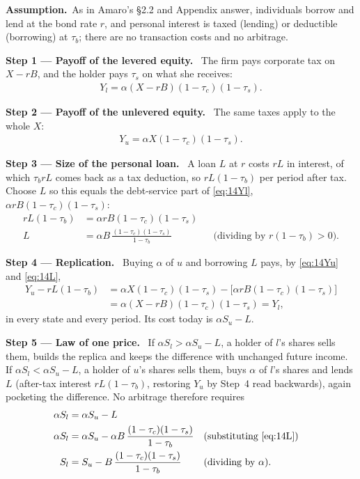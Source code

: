 \documentclass[11pt,a4paper]{article}
\numberwithin{equation}{section}
\newcommand{\step}[2]{\par\smallskip\noindent\textbf{Step #1 --- #2.}~}
\newcommand{\assumption}{\par\smallskip\noindent\textbf{Assumption.}~}
\begin{document}
\assumption As in Amaro's §2.2 and Appendix answer, individuals borrow and lend at the bond rate
$r$, and personal interest is taxed (lending) or deductible (borrowing) at $\tau_b$; there are no
transaction costs and no arbitrage.

\step{1}{Payoff of the levered equity} The firm pays corporate tax on $X-rB$, and the holder pays $\tau_s$ on what she receives:
\begin{align}
  Y_l = \alpha(X-rB)(1-\tau_c)(1-\tau_s). \label{eq:14Yl}
\end{align}

\step{2}{Payoff of the unlevered equity} The same taxes apply to the whole $X$:
\begin{align}
  Y_u = \alpha X(1-\tau_c)(1-\tau_s). \label{eq:14Yu}
\end{align}

\step{3}{Size of the personal loan} A loan $L$ at $r$ costs $rL$ in interest, of which $\tau_b rL$
comes back as a tax deduction, so $rL(1-\tau_b)$ per period after tax. Choose $L$ so this equals
the debt-service part of \eqref{eq:14Yl}, $\alpha rB(1-\tau_c)(1-\tau_s)$:
\begin{align}
  rL(1-\tau_b) &= \alpha rB(1-\tau_c)(1-\tau_s) \nonumber\\
  L &= \alpha B\,\frac{(1-\tau_c)(1-\tau_s)}{1-\tau_b} && \text{(dividing by } r(1-\tau_b)>0). \label{eq:14L}
\end{align}

\step{4}{Replication} Buying $\alpha$ of $u$ and borrowing $L$ pays, by \eqref{eq:14Yu} and \eqref{eq:14L},
\begin{align}
  Y_u - rL(1-\tau_b) &= \alpha X(1-\tau_c)(1-\tau_s)-\bigl[\alpha rB(1-\tau_c)(1-\tau_s)\bigr] \nonumber\\
     &= \alpha(X-rB)(1-\tau_c)(1-\tau_s) = Y_l, \nonumber
\end{align}
in every state and every period. Its cost today is $\alpha S_u-L$.

\step{5}{Law of one price} If $\alpha S_l>\alpha S_u-L$, a holder of $l$'s shares sells them, builds the
replica and keeps the difference with unchanged future income. If $\alpha S_l<\alpha S_u-L$, a holder
of $u$'s shares sells them, buys $\alpha$ of $l$'s shares and lends $L$ (after-tax interest
$rL(1-\tau_b)$, restoring $Y_u$ by Step~4 read backwards), again pocketing the difference.
No arbitrage therefore requires
\begin{align}
  \alpha S_l &= \alpha S_u - L \nonumber\\
  \alpha S_l &= \alpha S_u - \alpha B\,\frac{(1-\tau_c)(1-\tau_s)}{1-\tau_b} && \text{(substituting \eqref{eq:14L})} \nonumber\\
  S_l &= S_u - B\,\frac{(1-\tau_c)(1-\tau_s)}{1-\tau_b} && \text{(dividing by } \alpha). \label{eq:14Sl}
\end{align}
\end{document}
